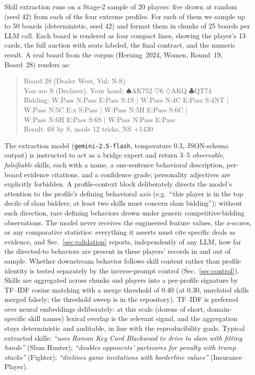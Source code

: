 \documentclass[runningheads]{llncs}
\begin{document}
Skill extraction runs on a Stage-2 sample of 20 players: five drawn at
random (seed 42) from each of the four extreme profiles. For each of
them we sample up to 50 boards (deterministic, seed 42) and format them
in chunks of 25 boards per LLM call. Each board
is rendered as four compact lines, showing the player's 13 cards, the full
auction with seats labeled, the final contract, and the numeric result.
A real board from the corpus (Herning~2024, Women, Round~19, Board~28)
renders as:

\begin{quote}\small\ttfamily
Board 28 (Dealer West, Vul: N-S)\\
You are S (Declarer). Your hand: $\spadesuit$AK752 $\heartsuit$6 $\diamondsuit$AKQ $\clubsuit$QT74\\
Bidding: W:Pass N:Pass E:Pass S:1S | W:Pass N:4C E:Pass S:4NT |\\
\hspace*{4.5em}W:Pass N:5C E:x S:Pass | W:Pass N:5H E:Pass S:6C |\\
\hspace*{4.5em}W:Pass N:6H E:Pass S:6S | W:Pass N:Pass E:Pass\\
Result: 6S by S, made 12 tricks, NS +1430
\end{quote}

The extraction model (\texttt{gemini-2.5-flash}, temperature 0.3,
JSON-schema output) is instructed to act as a bridge expert and return 3--5
\emph{observable, falsifiable} skills, each with a name, a one-sentence
behavioral description, per-board evidence citations, and a confidence
grade; personality adjectives are explicitly forbidden. A
profile-context block deliberately directs the model's attention to the
profile's defining behavioral \emph{axis} (e.g.\ ``this player is in
the top decile of slam bidders; at least two skills must concern slam
bidding''); without such direction, rare defining behaviors drown under
generic competitive-bidding observations. The model never receives the
engineered feature values, the z-scores, or any comparative statistics:
everything it asserts must cite specific deals as evidence, and
Sec.~\ref{sec:validation} reports, independently of any LLM, how far
the directed-to behaviors are present in these players' records in and
out of sample. Whether downstream behavior follows skill content rather than
profile identity is tested separately by the inverse-prompt control
(Sec.~\ref{sec:control}).
Skills are aggregated across chunks and players into a per-profile
signature by TF--IDF cosine matching with a merge threshold of 0.40
(at 0.30, unrelated skills merged falsely; the threshold sweep is in the
repository). TF--IDF is preferred over neural embeddings deliberately:
at this scale (dozens of short, domain-specific skill names) lexical
overlap is the relevant signal, and the aggregation stays deterministic
and auditable, in line with the reproducibility goals. Typical extracted skills: \emph{``uses Roman Key Card
Blackwood to drive to slam with fitting hands''} (Slam Hunter);
\emph{``doubles opponents' partscores for penalty with trump stacks''}
(Fighter); \emph{``declines game invitations with borderline values''}
(Insurance Player).
\end{document}
